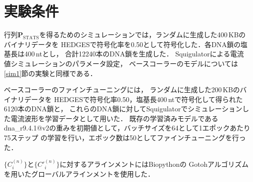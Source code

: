 \documentclass[sotsuron]{kuee}
\begin{document}
\section{実験条件}
行列$\bm{P}_{\mathrm{STATS}}$を得るためのシミュレーションでは，ランダムに生成した400\,KBのバイナリデータを
HEDGESで符号化率を0.50として符号化した．各DNA鎖の塩基長は400\,ntとし，
合計12240本のDNA鎖を生成した．
Squigulatorによる電流値シミュレーションのパラメータ設定，
ベースコーラーのモデルについては\ref{sim1}節の実験と同様である．

ベースコーラーのファインチューニングには，
ランダムに生成した200\,KBのバイナリデータを
HEDGESで符号化率0.50，塩基長400\,ntで符号化して得られた6120本のDNA鎖と，
これらのDNA鎖に対してSquigulatorでシミュレーションした電流波形を学習データとして用いた．
既存の学習済みモデルである
dna\_r9.4.1@v2の重みを初期値として，バッチサイズを64として1エポックあたり75ステップ
の学習を行い，エポック数は50としてファインチューニングを行った．

$\{C^{(n)}_i\}$と$\{C'^{(n)}_i\}$に対するアラインメントにはBiopythonの
Gotohアルゴリズムを用いたグローバルアラインメントを使用した\cite{biopython,GOTOH1982705}．
\end{document}
